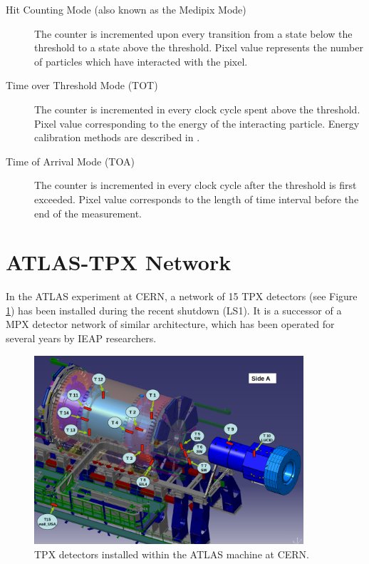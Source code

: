 \begin{description}
	\item[Hit Counting Mode (also known as the Medipix Mode)]
	The counter is incremented upon every transition from a state below the threshold to a state above the threshold. Pixel value represents the number of particles which have interacted with the pixel.

	\item[Time over Threshold Mode (TOT)]\label{tpx:tot}
	The counter is incremented in every clock cycle spent above the threshold. Pixel value corresponding to the energy of the interacting particle. Energy calibration methods are described in \cite{Jakubek2011S262}.

	\item[Time of Arrival Mode (TOA)]\label{tpx:toa}
	The counter is incremented in every clock cycle after the threshold is first exceeded. Pixel value corresponds to the length of time interval before the end of the measurement.
\end{description}

\section{ATLAS-TPX Network}
In the ATLAS experiment at CERN, a network of 15 TPX detectors (see Figure \ref{fig:tpx-positions-atlas}) has been installed during the recent shutdown (LS1). It is a successor of a MPX detector network of similar architecture, which has been operated for several years by IEAP researchers.

\begin{figure}[t]
\begin{center}
	\includegraphics[height=7cm]{figures/imported/tpx_positions}
\caption{TPX detectors installed within the ATLAS machine at CERN.}
\label{fig:tpx-positions-atlas}
\end{center}
\end{figure}

